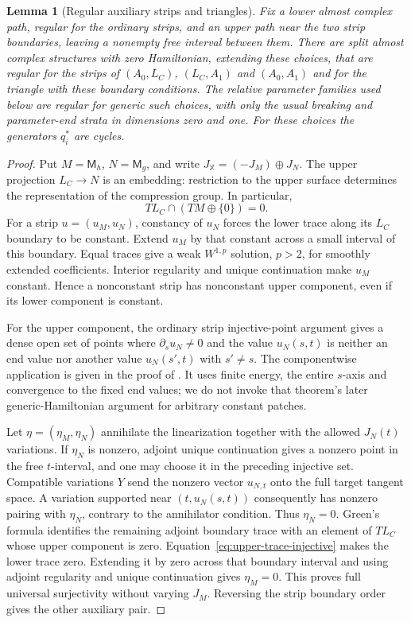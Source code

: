 \documentclass[11pt]{amsart}
\newtheorem{lemma}[theorem]{Lemma}
\theoremstyle{definition}
\theoremstyle{remark}
\theoremstyle{plain}
\numberwithin{equation}{section}
\newcommand{\Msf}{\mathsf{M}}
\begin{document}
\begin{lemma}[Regular auxiliary strips and triangles]
\label{lem:auxiliary-split-regularity}
Fix a lower almost complex path, regular for the ordinary strips, and an upper path near
the two strip boundaries, leaving a nonempty free interval between them. There are split
almost complex structures with zero Hamiltonian, extending these choices, that are regular
for the strips of $(A_0,L_C)$, $(L_C,A_1)$ and $(A_0,A_1)$ and for the triangle with these
boundary conditions. The relative parameter families used below are regular for generic
such choices, with only the usual breaking and parameter-end strata in dimensions zero and
one. For these choices the generators $q_i^*$ are cycles.
\end{lemma}
\begin{proof}
Put $M=\Msf_h$, $N=\Msf_g$, and write
$J_{\mathbb X}=(-J_M)\oplus J_N$. The upper projection $L_C\to N$ is an
embedding: restriction to the upper surface determines the
representation of the compression group. In particular,
\begin{equation}\label{eq:upper-trace-injective}
 TL_C\cap(TM\oplus\{0\})=0.
\end{equation}
For a strip $u=(u_M,u_N)$, constancy of $u_N$ forces the lower
trace along its $L_C$ boundary to be constant. Extend $u_M$ by
that constant across a small interval of this boundary. Equal
traces give a weak $W^{1,p}$ solution, $p>2$, for smoothly extended
coefficients. Interior regularity and unique continuation make
$u_M$ constant. Hence a nonconstant strip has nonconstant upper
component, even if its lower component is constant.

For the upper component, the ordinary strip injective-point
argument gives a dense open set of points where
$\partial_su_N\ne0$ and the value $u_N(s,t)$ is neither an end
value nor another value $u_N(s',t)$ with $s'\ne s$. The
componentwise application is given in the proof of
\cite[Theorem~3.2, Step~1a]{WW-constant}. It uses finite energy,
the entire $s$-axis and convergence to the fixed end values;
we do not invoke that theorem's later generic-Hamiltonian
argument for arbitrary constant patches.

Let $\eta=(\eta_M,\eta_N)$ annihilate the linearization together
with the allowed $J_N(t)$ variations. If $\eta_N$ is nonzero,
adjoint unique continuation gives a nonzero point in the free
$t$-interval, and one may choose it in the preceding injective
set. Compatible variations $Y$ send the nonzero vector $u_{N,t}$
onto the full target tangent space. A variation supported near
$(t,u_N(s,t))$ consequently has nonzero pairing with $\eta_N$,
contrary to the annihilator condition. Thus $\eta_N=0$.
Green's formula identifies the remaining adjoint boundary trace
with an element of $TL_C$ whose upper component is zero.
Equation~\eqref{eq:upper-trace-injective} makes the lower trace
zero. Extending it by zero across that boundary interval and
using adjoint regularity and unique continuation gives
$\eta_M=0$. This proves full universal surjectivity without
varying $J_M$. Reversing the strip boundary order gives the
other auxiliary pair.


\end{proof}
\end{document}
